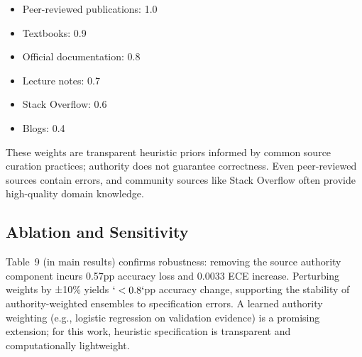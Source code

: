 \begin{itemize}
\item
  Peer-reviewed publications: 1.0
\item
  Textbooks: 0.9
\item
  Official documentation: 0.8
\item
  Lecture notes: 0.7
\item
  Stack Overflow: 0.6
\item
  Blogs: 0.4
\end{itemize}

These weights are transparent heuristic priors informed by common source curation practices; authority does not guarantee correctness. Even peer-reviewed sources contain errors, and community sources like Stack Overflow often provide high-quality domain knowledge.

\subsection{Ablation and Sensitivity}\label{ablation-and-sensitivity}

Table~9 (in main results) confirms robustness: removing the source authority component incurs 0.57pp accuracy loss and 0.0033 ECE increase. Perturbing weights by ±10\% yields \(`<0.8`\)pp accuracy change, supporting the stability of authority-weighted ensembles to specification errors. A learned authority weighting (e.g., logistic regression on validation evidence) is a promising extension; for this work, heuristic specification is transparent and computationally lightweight.
